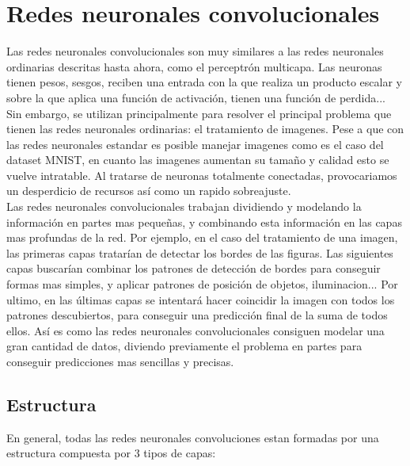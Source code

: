 \section{Redes neuronales convolucionales}
Las redes neuronales convolucionales son muy similares a las redes neuronales ordinarias descritas hasta ahora, como el perceptrón multicapa. Las neuronas tienen pesos, sesgos, reciben una entrada con la que realiza un producto escalar y sobre la que aplica una función de activación, tienen una función de perdida...\\
Sin embargo, se utilizan principalmente para resolver el principal problema que tienen las redes neuronales ordinarias: el tratamiento de imagenes. Pese a que con las redes neuronales estandar es posible manejar imagenes como es el caso del dataset MNIST, en cuanto las imagenes aumentan su tamaño y calidad esto se vuelve intratable. Al tratarse de neuronas totalmente conectadas, provocariamos un desperdicio de recursos así como un rapido sobreajuste.\\
Las redes neuronales convolucionales trabajan dividiendo y modelando la información en partes mas pequeñas, y combinando esta información en las capas mas profundas de la red. Por ejemplo, en el caso del tratamiento de una imagen, las primeras capas tratarían de detectar los bordes de las figuras. Las siguientes capas buscarían combinar los patrones de detección de bordes para conseguir formas mas simples, y aplicar patrones de posición de objetos, iluminacion... Por ultimo, en las últimas capas se intentará hacer coincidir la imagen con todos los patrones descubiertos, para conseguir una predicción final de la suma de todos ellos. Así es como las redes neuronales convolucionales consiguen modelar una gran cantidad de datos, diviendo previamente el problema en partes para conseguir predicciones mas sencillas y precisas.
\subsection{Estructura}
En general, todas las redes neuronales convoluciones estan formadas por una estructura compuesta por 3 tipos de capas:
